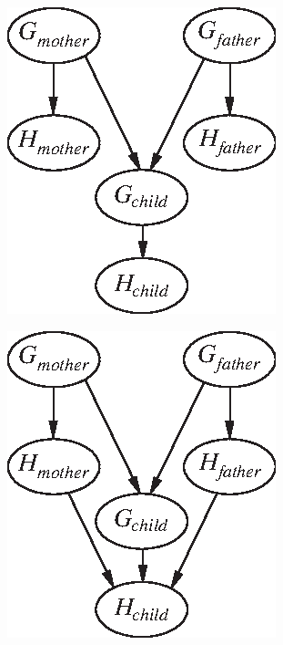\documentclass[9pt,a4paper]{extarticle}
\begin{document}
\begin{figure}
\begin{subfigure}{.3\linewidth}
\centering
\includegraphics[width=1.\textwidth]{figures/handedness1.eps}
\caption{}
\label{fig:sub1}
\end{subfigure}%
\begin{subfigure}{.3\linewidth}
\centering
\includegraphics[width=1.\textwidth]{figures/handedness2.eps}

\end{subfigure}
\end{figure}
\end{document}
